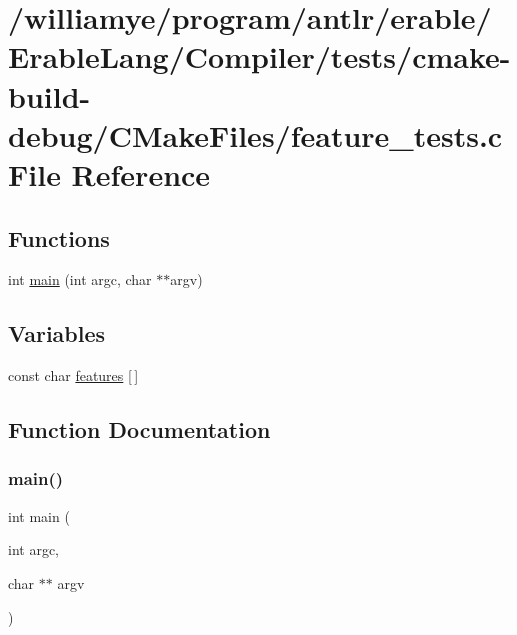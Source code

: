 \hypertarget{_compiler_2tests_2cmake-build-debug_2_c_make_files_2feature__tests_8c}{}\section{/williamye/program/antlr/erable/\+Erable\+Lang/\+Compiler/tests/cmake-\/build-\/debug/\+C\+Make\+Files/feature\+\_\+tests.c File Reference}
\label{_compiler_2tests_2cmake-build-debug_2_c_make_files_2feature__tests_8c}
\subsection*{Functions}
\begin{DoxyCompactItemize}
\item 
int \mbox{\hyperlink{_compiler_2tests_2cmake-build-debug_2_c_make_files_2feature__tests_8c_a3c04138a5bfe5d72780bb7e82a18e627}{main}} (int argc, char $\ast$$\ast$argv)
\end{DoxyCompactItemize}
\subsection*{Variables}
\begin{DoxyCompactItemize}
\item 
const char \mbox{\hyperlink{_compiler_2tests_2cmake-build-debug_2_c_make_files_2feature__tests_8c_a1582568e32f689337602a16bf8a5bff0}{features}} \mbox{[}$\,$\mbox{]}
\end{DoxyCompactItemize}


\subsection{Function Documentation}
\mbox{\label{_compiler_2tests_2cmake-build-debug_2_c_make_files_2feature__tests_8c_a3c04138a5bfe5d72780bb7e82a18e627}} 
\subsubsection{\texorpdfstring{main()}{main()}}
{\footnotesize\ttfamily int main (\begin{DoxyParamCaption}\item[{int}]{argc,  }\item[{char $\ast$$\ast$}]{argv }\end{DoxyParamCaption})}



